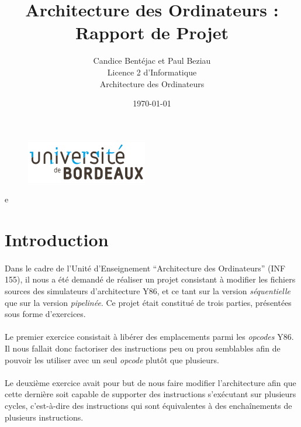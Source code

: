 \documentclass[12pt]{article}
\title{Architecture des Ordinateurs : Rapport de Projet}
\author{Candice Bentéjac et Paul Beziau\\
  Licence 2 d'Informatique\\ 
  Architecture des Ordinateurs}
\date{\today}
\begin{document}
\begin{figure}
  \includegraphics{logo_ub.png}
  \end{figure}
\maketitle

\vspace{5\baselineskip}
e 

\newpage

\tableofcontents
\newpage

\section*{Introduction}
\paragraph{}Dans le cadre de l'Unité d'Enseignement ``Architecture des Ordinateurs'' (INF 155), il nous a été demandé de réaliser un projet consistant à modifier les fichiers sources des simulateurs d'architecture Y86, et ce tant sur la version {\itshape séquentielle} que sur la version {\itshape pipelinée}. Ce projet était constitué de trois parties, présentées sous forme d'exercices.

\paragraph{}Le premier exercice consistait à libérer des emplacements parmi les {\itshape opcodes} Y86. Il nous fallait donc factoriser des instructions peu ou prou semblables afin de pouvoir les utiliser avec un seul {\itshape opcode} plutôt que plusieurs.

\paragraph{}Le deuxième exercice avait pour but de nous faire modifier l'architecture afin que cette dernière soit capable de supporter des instructions s'exécutant sur plusieurs cycles, c'est-à-dire des instructions qui sont équivalentes à des enchaînements de plusieurs instructions.
\end{document}
